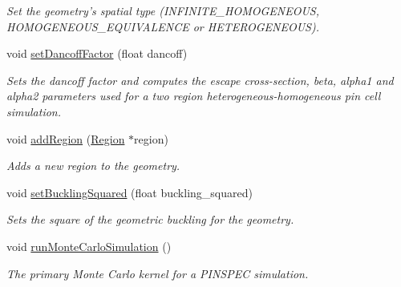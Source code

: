 \begin{DoxyCompactItemize}
\begin{DoxyCompactList}\small\item\em Set the geometry's spatial type (I\-N\-F\-I\-N\-I\-T\-E\-\_\-\-H\-O\-M\-O\-G\-E\-N\-E\-O\-U\-S, H\-O\-M\-O\-G\-E\-N\-E\-O\-U\-S\-\_\-\-E\-Q\-U\-I\-V\-A\-L\-E\-N\-C\-E or H\-E\-T\-E\-R\-O\-G\-E\-N\-E\-O\-U\-S). \end{DoxyCompactList}\item 
void \hyperlink{classGeometry_a0ef3fcbefaf7079ee1667adc3d0dbe54}{set\-Dancoff\-Factor} (float dancoff)
\begin{DoxyCompactList}\small\item\em Sets the dancoff factor and computes the escape cross-\/section, beta, alpha1 and alpha2 parameters used for a two region heterogeneous-\/homogeneous pin cell simulation. \end{DoxyCompactList}\item 
void \hyperlink{classGeometry_a68b1626c22c75914eafdcee252406b62}{add\-Region} (\hyperlink{classRegion}{Region} $\ast$region)
\begin{DoxyCompactList}\small\item\em Adds a new region to the geometry. \end{DoxyCompactList}\item 
void \hyperlink{classGeometry_a81f067e09349731a0b90bdda98b83594}{set\-Buckling\-Squared} (float buckling\-\_\-squared)
\begin{DoxyCompactList}\small\item\em Sets the square of the geometric buckling for the geometry. \end{DoxyCompactList}\item 
void \hyperlink{classGeometry_a32ac1087eeb0f71d4f36b751e65cfe9d}{run\-Monte\-Carlo\-Simulation} ()
\begin{DoxyCompactList}\small\item\em The primary Monte Carlo kernel for a P\-I\-N\-S\-P\-E\-C simulation. \end{DoxyCompactList}\end{DoxyCompactItemize}
